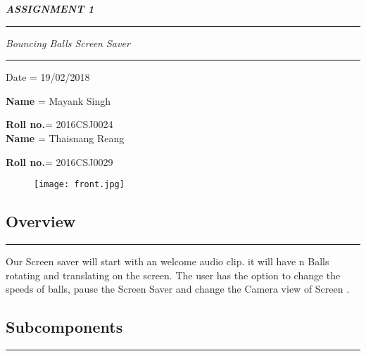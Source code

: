 \documentclass{article}
\begin{document}
\begin{center}

\begin{Huge}

\textbf{\textit{ASSIGNMENT 1}}
\noindent
{\color{red} \rule{\linewidth}{0.5mm} }
\textit{Bouncing Balls Screen Saver}
\noindent
{\color{red} \rule{\linewidth}{0.3mm} }
\end{Huge}
Date = 19/02/2018
\end{center}

\begin{large}




\color{red}\textbf{Name} = \color{black}Mayank Singh 

 
\color{red}\textbf{Roll no.}=\color{black}  2016CSJ0024\\


\color{red}\textbf{Name} =\color{black} Thaisnang Reang

  
\color{red}\textbf{Roll no.}=  \color{black}2016CSJ0029

\end{large}
\begin{figure}[b!]
 	\texttt{[image: front.jpg]}
\end{figure}

\newpage
\begin{huge}
\section{Overview}
\end{huge}
\noindent
{\color{red} \rule{\linewidth}{0.2mm} }

Our Screen saver will start with an welcome audio clip. it will have n Balls rotating and translating on the screen. The user has the option to change the speeds of  balls, pause the Screen Saver and change the Camera view of Screen .

\hspace*{-5cm}%
\begin{huge}
\section{Subcomponents}
\noindent
{\color{red} \rule{\linewidth}{0.2mm} }
\end{huge}
\end{document}
